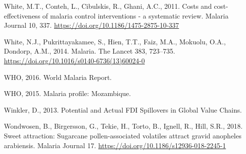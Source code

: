 \documentclass[]{article}
\begin{document}
\hypertarget{ref-White_2011}{}
White, M.T., Conteh, L., Cibulskis, R., Ghani, A.C., 2011. Costs and
cost-effectiveness of malaria control interventions - a systematic
review. Malaria Journal 10, 337.
\url{https://doi.org/10.1186/1475-2875-10-337}

\hypertarget{ref-White2014}{}
White, N.J., Pukrittayakamee, S., Hien, T.T., Faiz, M.A., Mokuolu, O.A.,
Dondorp, A.M., 2014. Malaria. The Lancet 383, 723--735.
\url{https://doi.org/10.1016/s0140-6736(13)60024-0}

\hypertarget{ref-World2016}{}
WHO, 2016. World Malaria Report.

\hypertarget{ref-whoprof}{}
WHO, 2015. Malaria profile: Mozambique.

\hypertarget{ref-Winkler}{}
Winkler, D., 2013. Potential and Actual FDI Spillovers in Global Value
Chains.

\hypertarget{ref-Wondwosen2018}{}
Wondwosen, B., Birgersson, G., Tekie, H., Torto, B., Ignell, R., Hill,
S.R., 2018. Sweet attraction: Sugarcane pollen-associated volatiles
attract gravid anopheles arabiensis. Malaria Journal 17.
\url{https://doi.org/10.1186/s12936-018-2245-1}
\end{document}
